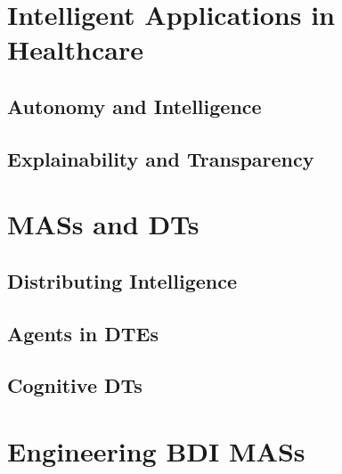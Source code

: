 \documentclass[12pt,a4paper,openright,twoside]{book}
\begin{document}
\chapter{Intelligent Applications in Healthcare}
\label{chap:intelligent-applications-healthcare}

\section{Autonomy and Intelligence}

\section{Explainability and Transparency}


\chapter{\aclp{MAS} and \aclp{DT}}
\label{chap:mas-dt}

\section{Distributing Intelligence}

\section{Agents in \aclp{DTE}}

\section{Cognitive \aclp{DT}}

\chapter{Engineering \acs{BDI} \aclp{MAS}}
\label{chap:mas-engineering}
\end{document}
